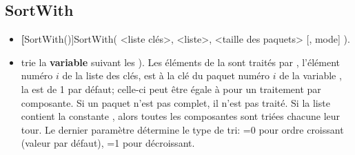 \subsection{SortWith}
\begin{itemize}
 \item \util \textbf[SortWith()]{SortWith( <liste clés>, <liste>, <taille des paquets> [, mode] )}.
 \item \desc trie la \textbf{variable}  suivant les ). Les éléments de la  sont traités par , l'élément numéro $i$ de la liste des clés, est à la clé du paquet numéro $i$ de la variable , la  est de 1 par défaut; celle-ci peut être égale à \jump pour un traitement par composante. Si un paquet n'est pas complet, il n'est pas traité. Si la liste contient la constante \jump, alors toutes les composantes sont triées chacune leur tour. Le dernier paramètre détermine le type de tri: =0 pour ordre croissant (valeur par défaut), =1 pour décroissant.
\end{itemize}

